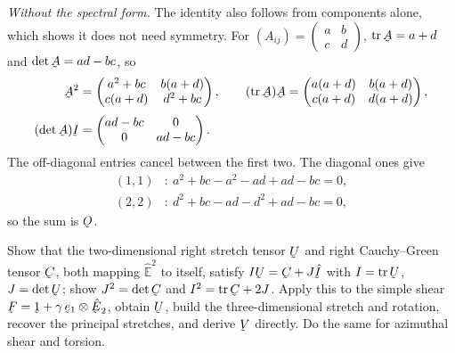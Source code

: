 \emph{Without the spectral form.} The identity also follows from
components alone, which shows it does not need symmetry. For
$(A_{ij})=\left(\begin{smallmatrix}a&b\\ c&d\end{smallmatrix}\right)$,
$\tr\bA=a+d$ and $\det\bA=ad-bc$, so
\[
\begin{aligned}
   \bA^{2}&=\begin{pmatrix}a^{2}+bc&b(a+d)\\
      c(a+d)&d^{2}+bc\end{pmatrix},\qquad
   (\tr\bA)\bA=\begin{pmatrix}a(a+d)&b(a+d)\\
      c(a+d)&d(a+d)\end{pmatrix},\\[1mm]
   (\det\bA)\I&=\begin{pmatrix}ad-bc&0\\ 0&ad-bc\end{pmatrix}.
\end{aligned}
\]
The off-diagonal entries cancel between the first two. The diagonal ones
give
\[
\begin{aligned}
   (1,1)&:\ a^{2}+bc-a^{2}-ad+ad-bc=0,\\
   (2,2)&:\ d^{2}+bc-ad-d^{2}+ad-bc=0,
\end{aligned}
\]
so the sum is $\Ob$.

\begin{problem}
Show that the two-dimensional right stretch tensor $\bU$ and right
Cauchy--Green tensor $\bC$, both mapping $\hat{\mathbb{E}}^{2}$ to itself, satisfy
$I\bU=\bC+J\hI$ with $I=\tr\bU$, $J=\det\bU$; show $J^{2}=\det\bC$ and
$I^{2}=\tr\bC+2J$. Apply this to the simple shear
$\bF=\shift+\gamma\,\be_{1}\otimes\hbE_{2}$, obtain $\bU$, build the
three-dimensional stretch and rotation, recover the principal stretches,
and derive $\bV$ directly. Do the same for azimuthal shear and torsion.
\end{problem}

